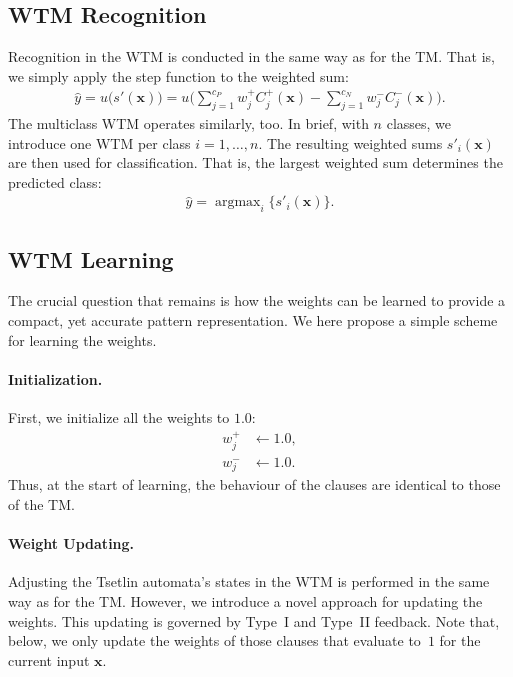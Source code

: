 \documentclass[letterpaper]{article}
\begin{document}
\subsection{WTM Recognition}
Recognition in the WTM is conducted in the same way as for the TM. That is, we simply apply the step function to the weighted sum:
\begin{align}
\hat y=u\bigl(s'(\mathbf x)\bigr)=u\biggl(
\sum_{j=1}^{c_P}w^+_j C^+_j(\mathbf x)-\sum_{j=1}^{c_N}w^-_jC^-_j(\mathbf x)\biggr).
\end{align}
The multiclass WTM operates similarly, too. In brief, with $n$ classes, we introduce one WTM per class $i=1,\ldots,n$. The resulting weighted sums $s'_i(\mathbf x)$ are then used for  classification. That is, the largest weighted sum determines the predicted class:
\begin{align}
\hat y=\mathop{\mathrm{argmax}}_i\{s'_i(\mathbf x)\}.
\end{align}

\subsection{WTM Learning}
The crucial question that remains is how the weights can be learned to provide a compact, yet accurate pattern representation. We here propose a simple scheme for learning the weights.

\paragraph{Initialization.} First, we initialize all the weights to $1.0$:
\begin{align}
w^+_j&\gets 1.0,\\
w^-_j&\gets 1.0.
\end{align}
Thus, at the start of learning, the behaviour of the clauses are identical to those of the TM.

\paragraph{Weight Updating.} Adjusting the Tsetlin automata's states in the WTM is performed in the same way as for the TM. However, we introduce a novel approach for updating the weights. This updating is governed by Type~I and Type~II feedback. Note that, below, we only update the weights of those clauses that evaluate to~$1$ for the current input $\mathbf x$.
\end{document}
